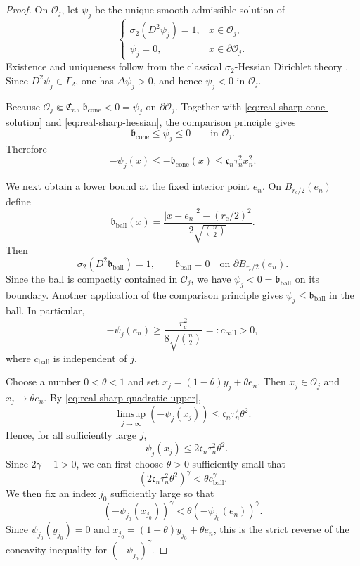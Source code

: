 \documentclass{article}
\numberwithin{equation}{section}
\begin{document}
\begin{proof}
On $\mathcal O_j$, let $\psi_j$ be the unique smooth admissible
solution of
\begin{equation}
\label{eq:real-sharp-hessian}
\begin{cases}
\sigma_2(D^2\psi_j)=1,
& x\in\mathcal O_j,\\
\psi_j=0,
& x\in\partial\mathcal O_j.
\end{cases}
\end{equation}
Existence and uniqueness follow from the classical
$\sigma_2$-Hessian Dirichlet theory \cite{CNS85}. Since
$D^2\psi_j\in\Gamma_2$, one has $\Delta\psi_j>0$, and hence
$\psi_j<0$ in $\mathcal O_j$.

Because $\mathcal O_j\Subset\mathfrak C_n$,
$\mathfrak b_{\mathrm{cone}}<0=\psi_j$ on
$\partial\mathcal O_j$. Together with
\eqref{eq:real-sharp-cone-solution} and
\eqref{eq:real-sharp-hessian}, the comparison principle gives
\[
\mathfrak b_{\mathrm{cone}}
\le
\psi_j
\le0
\qquad\text{in }\mathcal O_j.
\]
Therefore
\begin{equation}
\label{eq:real-sharp-quadratic-upper}
-\psi_j(x)
\le
-\mathfrak b_{\mathrm{cone}}(x)
\le
\mathfrak c_n\tau_n^2x_n^2.
\end{equation}

We next obtain a lower bound at the fixed interior point $e_n$.
On $B_{r_{\mathrm c}/2}(e_n)$ define
\[
\mathfrak b_{\mathrm{ball}}(x)
=
\frac{
|x-e_n|^2-(r_{\mathrm c}/2)^2
}{
2\sqrt{\binom n2}
}.
\]
Then
\[
\sigma_2(D^2\mathfrak b_{\mathrm{ball}})=1,
\qquad
\mathfrak b_{\mathrm{ball}}=0
\quad\text{on }
\partial B_{r_{\mathrm c}/2}(e_n).
\]
Since the ball is compactly contained in $\mathcal O_j$, we have
$\psi_j<0=\mathfrak b_{\mathrm{ball}}$ on its boundary. Another
application of the comparison principle gives
$\psi_j\le\mathfrak b_{\mathrm{ball}}$ in the ball. In particular,
\begin{equation}
\label{eq:real-sharp-interior-lower}
-\psi_j(e_n)
\ge
\frac{r_{\mathrm c}^2}
{8\sqrt{\binom n2}}
=:c_{\mathrm{ball}}>0,
\end{equation}
where $c_{\mathrm{ball}}$ is independent of $j$.

Choose a number $0<\theta<1$ and set
$x_j=(1-\theta)y_j+\theta e_n$. Then
$x_j\in\mathcal O_j$ and $x_j\to\theta e_n$. By
\eqref{eq:real-sharp-quadratic-upper},
\[
\limsup_{j\to\infty}
(-\psi_j(x_j))
\le
\mathfrak c_n\tau_n^2\theta^2.
\]
Hence, for all sufficiently large $j$,
\[
-\psi_j(x_j)
\le
2\mathfrak c_n\tau_n^2\theta^2.
\]
Since $2\gamma-1>0$, we can first choose $\theta>0$ sufficiently
small that
\begin{equation}
\label{eq:real-sharp-scale-gap}
\left(
2\mathfrak c_n\tau_n^2\theta^2
\right)^\gamma
<
\theta c_{\mathrm{ball}}^\gamma.
\end{equation}
We then fix an index $j_0$ sufficiently large so that
\[
(-\psi_{j_0}(x_{j_0}))^\gamma
<
\theta(-\psi_{j_0}(e_n))^\gamma.
\]
Since $\psi_{j_0}(y_{j_0})=0$ and
$x_{j_0}=(1-\theta)y_{j_0}+\theta e_n$, this is the strict reverse
of the concavity inequality for $(-\psi_{j_0})^\gamma$.


\end{proof}
\end{document}
